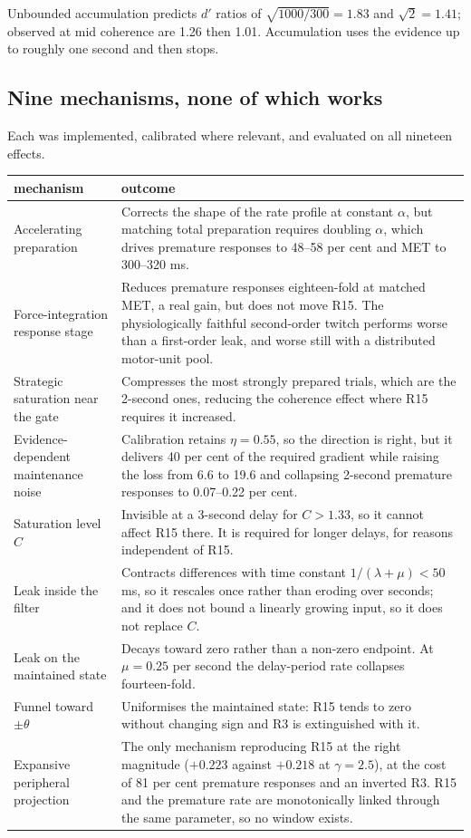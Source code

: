 \documentclass[11pt,a4paper]{article}
\theoremstyle{plain}
\theoremstyle{remark}
\begin{document}
Unbounded accumulation predicts $d'$ ratios of $\sqrt{1000/300}=1.83$ and $\sqrt2=1.41$;
observed at mid coherence are 1.26 then 1.01. Accumulation uses the evidence up to roughly
one second and then stops.

\subsection{Nine mechanisms, none of which works}

Each was implemented, calibrated where relevant, and evaluated on all nineteen effects.

\begin{longtable}{p{}p{}}
\toprule
mechanism & outcome\\
\midrule
\endhead
Accelerating preparation & Corrects the shape of the rate profile at constant $\alpha$, but
matching total preparation requires doubling $\alpha$, which drives premature responses to
48--58 per cent and MET to 300--320 ms.\\
Force-integration response stage & Reduces premature responses eighteen-fold at matched MET,
a real gain, but does not move R15. The physiologically faithful second-order twitch
performs worse than a first-order leak, and worse still with a distributed motor-unit
pool.\\
Strategic saturation near the gate & Compresses the most strongly prepared trials, which are
the 2-second ones, reducing the coherence effect where R15 requires it increased.\\
Evidence-dependent maintenance noise & Calibration retains $\eta=0.55$, so the direction is
right, but it delivers 40 per cent of the required gradient while raising the loss from 6.6
to 19.6 and collapsing 2-second premature responses to 0.07--0.22 per cent.\\
Saturation level $C$ & Invisible at a 3-second delay for $C>1.33$, so it cannot affect R15
there. It is required for longer delays, for reasons independent of R15.\\
Leak inside the filter & Contracts differences with time constant $1/(\lambda+\mu)<50$ ms,
so it rescales once rather than eroding over seconds; and it does not bound a linearly
growing input, so it does not replace $C$.\\
Leak on the maintained state & Decays toward zero rather than a non-zero endpoint. At
$\mu=0.25$ per second the delay-period rate collapses fourteen-fold.\\
Funnel toward $\pm\theta$ & Uniformises the maintained state: R15 tends to zero without
changing sign and R3 is extinguished with it.\\
Expansive peripheral projection & The only mechanism reproducing R15 at the right magnitude
($+0.223$ against $+0.218$ at $\gamma=2.5$), at the cost of 81 per cent premature responses
and an inverted R3. R15 and the premature rate are monotonically linked through the same
parameter, so no window exists.\\
\bottomrule
\end{longtable}
\end{document}
